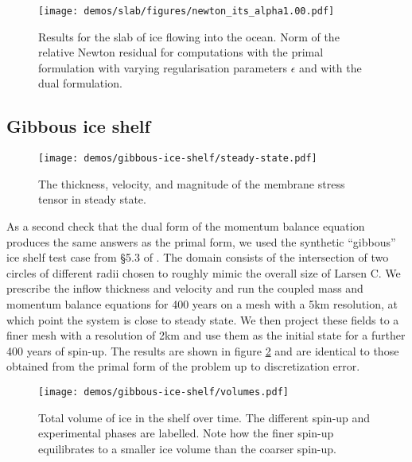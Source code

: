 \documentclass{article}
\theoremstyle{definition}
\theoremstyle{plain}
\begin{document}
\begin{figure}[t]
	\centering
	\texttt{[image: demos/slab/figures/newton\_its\_alpha1.00.pdf]}
	\caption{Results for the slab of ice flowing into the ocean. Norm of the relative Newton residual for computations with the primal formulation with varying regularisation parameters $\epsilon$ and with the dual formulation.}
	\label{fig:newton-its}
\end{figure}

\subsection{Gibbous ice shelf} \label{sec:gibbous-ice-shelf}

\begin{figure}[t]
    \begin{center}
        \texttt{[image: demos/gibbous-ice-shelf/steady-state.pdf]}
    \end{center}
    \caption{The thickness, velocity, and magnitude of the membrane stress tensor in steady state.}
    \label{fig:gibbous}
\end{figure}

As a second check that the dual form of the momentum balance equation produces the same answers as the primal form, we used the synthetic ``gibbous'' ice shelf test case from \S5.3 of \citet{shapero2021icepack}.
The domain consists of the intersection of two circles of different radii chosen to roughly mimic the overall size of Larsen C.
We prescribe the inflow thickness and velocity and run the coupled mass and momentum balance equations for 400 years on a mesh with a 5km resolution, at which point the system is close to steady state.
We then project these fields to a finer mesh with a resolution of 2km and use them as the initial state for a further 400 years of spin-up.
The results are shown in figure \ref{fig:gibbous} and are identical to those obtained from the primal form of the problem up to discretization error.

\begin{figure}[t]
    \begin{center}
        \texttt{[image: demos/gibbous-ice-shelf/volumes.pdf]}
    \end{center}
    \caption{Total volume of ice in the shelf over time.
    The different spin-up and experimental phases are labelled.
    Note how the finer spin-up equilibrates to a smaller ice volume than the coarser spin-up.}
    \label{fig:gibbous-calving-volumes}
\end{figure}
\end{document}
